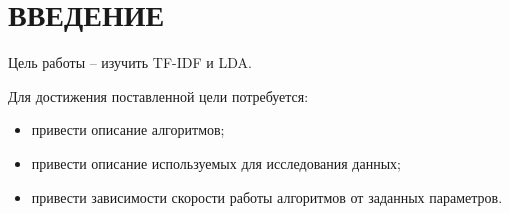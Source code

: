 \section*{ВВЕДЕНИЕ}

Цель работы -- изучить TF-IDF и LDA.

Для достижения поставленной цели потребуется:
\begin{itemize}
	\item привести описание алгоритмов;
	\item привести описание используемых для исследования данных;
	\item привести зависимости скорости работы алгоритмов от заданных параметров.
\end{itemize}

\pagebreak